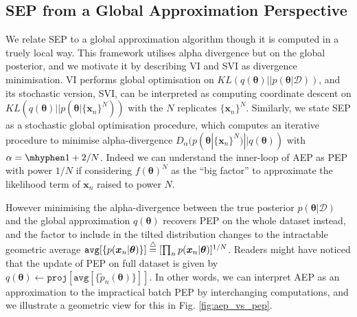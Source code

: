 \documentclass{article} %
\begin{document}

%
\subsection{SEP from a Global Approximation Perspective}
We relate SEP to a global approximation algorithm though it is computed in a truely local way. This framework utilises alpha divergence but on the global posterior, and we motivate it by describing VI and SVI as divergence minimisation.
%
VI performs global optimisation on $KL(q(\bm{\theta})||p(\bm{\theta}|\mathcal{D}))$, and its stochastic version, SVI, can be interpreted as computing coordinate descent on $KL(q(\bm{\theta}) || p(\bm{\theta} | \{\bm{x}_n\}^N))$ with the $N$ replicates $\{\bm{x}_n\}^N$. Similarly, we state SEP as a stochastic global optimisation procedure, which computes an iterative procedure to minimise alpha-divergence $D_{\alpha}(p(\bm{\theta} | \{\bm{x}_n\}^N) || q(\bm{\theta}))$ with $\alpha = \mhyphen 1 + 2/N$. Indeed we can understand the inner-loop of AEP as PEP with power $1/N$ if considering $f(\bm{\theta})^N$ as the ``big factor'' to approximate the likelihood term of $\bm{x}_n$ raised to power $N$.

However minimising the alpha-divergence between the true posterior $p(\bm{\theta}|\mathcal{D})$ and the global approximation $q(\bm{\theta})$ recovers PEP on the whole dataset instead, and the factor to include in the tilted distribution changes to the intractable geometric average $\mathtt{avg}[\{p(\bm{x}_n | \bm{\theta}) \}] \buildrel\triangle\over = [\prod_n p(\bm{x}_n | \bm{\theta}) ]^{1/N} $. Readers might have noticed that the update of PEP on full dataset is given by $q(\bm{\theta}) \leftarrow \mathtt{proj}[\mathtt{avg}[\{ \tilde{p}_n(\bm{\theta}) \}]]$. In other words, we can interpret AEP as an approximation to the impractical batch PEP by interchanging computations, and we illustrate a geometric view for this in Fig. \ref{fig:aep_vs_pep}.
\end{document}
